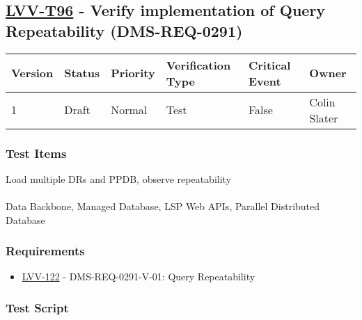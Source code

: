 \hypertarget{lvv-t96---verify-implementation-of-query-repeatability-dms-req-0291}{%
\subsection{\texorpdfstring{\href{https://jira.lsstcorp.org/secure/Tests.jspa\#/testCase/LVV-T96}{LVV-T96}
- Verify implementation of Query Repeatability
(DMS-REQ-0291)}{LVV-T96 - Verify implementation of Query Repeatability (DMS-REQ-0291)}}\label{lvv-t96---verify-implementation-of-query-repeatability-dms-req-0291}}

\begin{longtable}[]{@{}llllll@{}}
\toprule
Version & Status & Priority & Verification Type & Critical Event &
Owner\tabularnewline
\midrule
\endhead
1 & Draft & Normal & Test & False & Colin Slater\tabularnewline
\bottomrule
\end{longtable}

\hypertarget{test-items-72}{%
\subsubsection{Test Items}\label{test-items-72}}

Load multiple DRs and PPDB, observe repeatability\\
~\\
Data Backbone, Managed Database, LSP Web APIs, Parallel Distributed
Database

\hypertarget{requirements-73}{%
\subsubsection{Requirements}\label{requirements-73}}

\begin{itemize}
\tightlist
\item
  \href{https://jira.lsstcorp.org/browse/LVV-122}{LVV-122} -
  DMS-REQ-0291-V-01: Query Repeatability
\end{itemize}

\hypertarget{test-script-73}{%
\subsubsection{Test Script}\label{test-script-73}}

